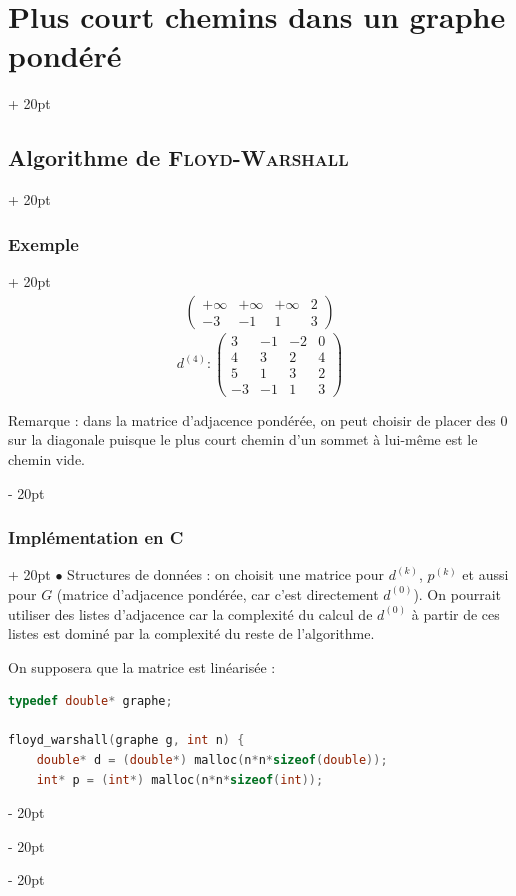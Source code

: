 \documentclass[a4paper, 12pt, twoside]{article}
\newcommand{\ind}[1][20pt]{\advance\leftskip + #1}
\newcommand{\deind}[1][20pt]{\advance\leftskip - #1}
\newenvironment{indt}[2][20pt]{#2 \par \ind[#1]}{\par \deind} %
\begin{document}
\begin{indt}{\section{Plus court chemins dans un graphe pondéré}}
\begin{indt}{\subsection{Algorithme de \textsc{Floyd-Warshall}}}
\begin{indt}{\subsubsection{Exemple}}
\[\begin{array}{cc}
\begin{pmatrix}
                            +\infty & +\infty & +\infty & 2
                            \\
                            -3 & -1 & 1 & \boxed 3
                        \end{pmatrix}
                    \end{array}
                \]
                \[
                    d^{(4)} :
                    \begin{pmatrix}
                        \boxed 3 & \boxed{-1} & -2 & 0
                        \\
                        4 & \boxed 3 & 2 & 4
                        \\
                        \boxed 5 & \boxed 1 & \boxed 3 & 2
                        \\
                        -3 & -1 & 1 & 3
                    \end{pmatrix}
                \]

                Remarque : dans la matrice d'adjacence pondérée, on peut choisir de placer des $0$ sur la diagonale puisque le plus court chemin d'un sommet à lui-même est le chemin vide.
            \end{indt}

            \vspace{12pt}
            
            \begin{indt}{\subsubsection{Implémentation en C}}
                $\bullet$ Structures de données : on choisit une matrice pour $d^{(k)}$, $p^{(k)}$ et aussi pour $G$ (matrice d'adjacence pondérée, car c'est directement $d^{(0)}$).
                On pourrait utiliser des listes d'adjacence car la complexité du calcul de $d^{(0)}$ à partir de ces listes est dominé par la complexité du reste de l'algorithme.

                \vspace{6pt}
                
                On supposera que la matrice est linéarisée :
                \begin{lstlisting}[language=C, xleftmargin=80pt]
typedef double* graphe;

floyd_warshall(graphe g, int n) {
    double* d = (double*) malloc(n*n*sizeof(double));
    int* p = (int*) malloc(n*n*sizeof(int));


\end{lstlisting}
\end{indt}
\end{indt}
\end{indt}
\end{document}
